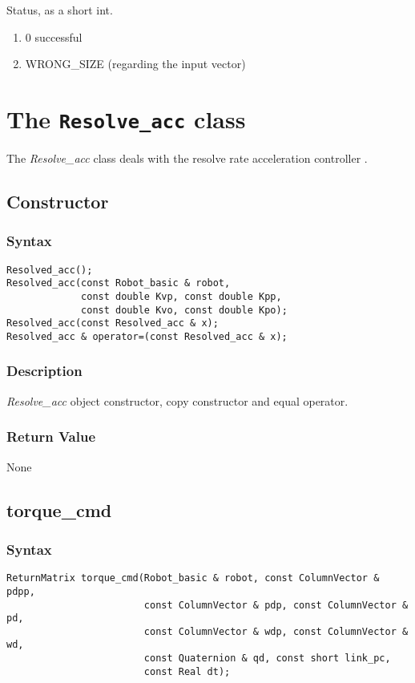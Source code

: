 \documentclass[dvips,11pt,fleqn]{report}
\begin{document}
Status, as a short int.
\begin{enumerate}
\item[] 0 successful
\item[] WRONG\_SIZE (regarding the input vector)
\end{enumerate}

\newpage

\section{The \texttt{Resolve\_acc} class}

The \emph{Resolve\_acc} class deals with the resolve rate acceleration
controller \cite{Caccavale98}.

\subsection*{Constructor}
\subsubsection*{Syntax}
\begin{verbatim}
Resolved_acc();
Resolved_acc(const Robot_basic & robot, 
             const double Kvp, const double Kpp, 
             const double Kvo, const double Kpo);
Resolved_acc(const Resolved_acc & x);
Resolved_acc & operator=(const Resolved_acc & x);
\end{verbatim}

\subsubsection*{Description}   
\emph{Resolve\_acc} object constructor, copy constructor and equal
operator.

\subsubsection*{Return Value}

None

\newpage

\subsection*{torque\_cmd}
\subsubsection*{Syntax}
\begin{verbatim}
ReturnMatrix torque_cmd(Robot_basic & robot, const ColumnVector & pdpp, 
                        const ColumnVector & pdp, const ColumnVector & pd, 
                        const ColumnVector & wdp, const ColumnVector & wd, 
                        const Quaternion & qd, const short link_pc, 
                        const Real dt);
\end{verbatim}
\end{document}
